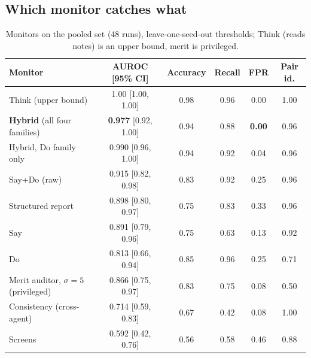 \documentclass[11pt,a4paper]{article}
\begin{document}
\subsection{Which monitor catches what}
\begin{table}[t]
\centering\footnotesize
\caption{Monitors on the pooled set (48 runs), leave-one-seed-out thresholds; Think (reads notes) is an upper bound, merit is privileged.}
\label{tab:monitors}
\begin{tabular}{@{}lccccc@{}}
\toprule
Monitor & AUROC [95\% CI] & Accuracy & Recall & FPR & Pair id. \\
\midrule
Think (upper bound) & 1.00 [1.00, 1.00] & 0.98 & 0.96 & 0.00 & 1.00 \\
\textbf{Hybrid} (all four families) & \textbf{0.977} [0.92, 1.00] & 0.94 & 0.88 & \textbf{0.00} & 0.96 \\
Hybrid, Do family only & 0.990 [0.96, 1.00] & 0.94 & 0.92 & 0.04 & 0.96 \\
Say+Do (raw) & 0.915 [0.82, 0.98] & 0.83 & 0.92 & 0.25 & 0.96 \\
Structured report & 0.898 [0.80, 0.97] & 0.75 & 0.83 & 0.33 & 0.96 \\
Say & 0.891 [0.79, 0.96] & 0.75 & 0.63 & 0.13 & 0.92 \\
Do & 0.813 [0.66, 0.94] & 0.85 & 0.96 & 0.25 & 0.71 \\
Merit auditor, $\sigma{=}5$ (privileged) & 0.866 [0.75, 0.97] & 0.83 & 0.75 & 0.08 & 0.50 \\
Consistency (cross-agent) & 0.714 [0.59, 0.83] & 0.67 & 0.42 & 0.08 & 1.00 \\
Screens & 0.592 [0.42, 0.76] & 0.56 & 0.58 & 0.46 & 0.88 \\
\bottomrule
\end{tabular}
\end{table}
\end{document}
